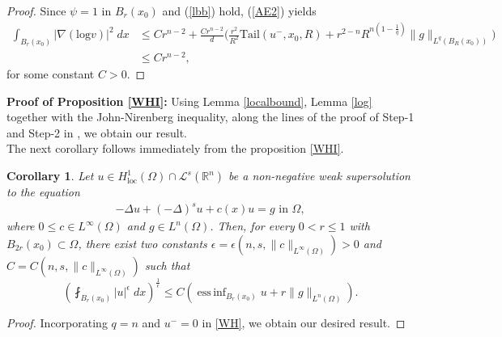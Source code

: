 \documentclass[11pt, notitlepage]{article}
\def\R{\mathbb{R}}
\DeclareMathOperator*{\essinf}{ess\,inf}
\newcommand{\De} {\Delta}
\newtheorem{Corollary}[Theorem]{Corollary}
\begin{document}
{\begin{proof}
Since $\psi=1$ in $B_{r}(x_0)$ and (\ref{lbb}) hold, (\ref{AE2}) yields
\begin{align*}
    \int_{B_r(x_0)}|\nabla (\mathrm{log}v)|^2\;dx&\leq Cr^{n-2}+\frac{Cr^{n-2}}{d}\Big(\frac{r^2}{R^2}\mathrm{Tail}(u^-,x_0,R)+r^{2-n}R^{n(1-\frac{1}{q})}\|g\|_{L^q(B_R(x_0))}\Big)\nonumber\\
    &\leq Cr^{n-2},
\end{align*}
for some constant $C>0$.
\end{proof}
\textbf{Proof of Proposition \ref{WHI}:} Using Lemma \ref{localbound}, Lemma \ref{log} together with the John-Nirenberg inequality, along the lines of the proof of Step-1 and Step-2 in \cite[Theorem 1.1]{Garain25}, we obtain our result.\\
The next corollary follows immediately from the proposition \ref{WHI}.
\begin{Corollary}
    Let $u\in H^1_{\mathrm{loc}}(\Omega)\cap \mathcal{L}^s(\R^n)$ be a non-negative weak supersolution to the equation 
    \begin{align*}
          -\De u+(-\De)^su+c(x)u=g \text{ in }\Omega,
      \end{align*}
where $0\leq c\in L^\infty(\Omega)$ and $g\in L^n(\Omega)$. Then, for every $0<r\leq 1$ with $B_{2r}(x_0)\subset \Omega$, there exist two constants $\epsilon=\epsilon(n,s,\|c\|_{L^\infty(\Omega)})>0$ and $C=C(n,s,\|c\|_{L^\infty(\Omega)})$ such that
$$\left( \fint_{B_{r}(x_0)} |u|^\epsilon\;dx\right)^\frac{1}{\epsilon}\leq C\left( \essinf_{B_{r}(x_0)} u+r\|g\|_{L^n(\Omega)} \right).$$
\end{Corollary}
\begin{proof}
    Incorporating $q=n$ and $u^-=0$ in \eqref{WH}, we obtain our desired result.
\end{proof}
}
\end{document}
